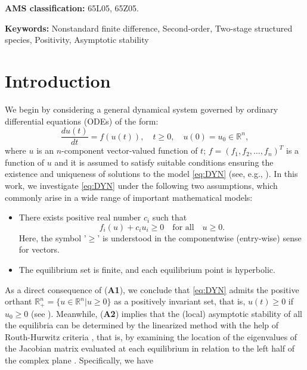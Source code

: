 \documentclass[12pt]{article}
\theoremstyle{definition}
\theoremstyle{remark}
\numberwithin{equation}{section}
\begin{document}
\begin{minipage}{0.9\linewidth}
 \footnotesize
\textbf{AMS classification:} 65L05, 65Z05.


\medskip

\noindent
\textbf{Keywords:} 
Nonstandard finite difference, Second-order, Two-stage structured species, Positivity, Asymptotic stability

\end{minipage}

\section{Introduction}\label{intro}
We begin by considering a general dynamical system governed by ordinary differential equations (ODEs) of the form:
\begin{equation}\label{eq:DYN}
\dfrac{du(t)}{dt} = f(u(t)), \quad t \geq 0, \quad u(0) = u_0 \in \mathbb{R}^n,
\end{equation}
where $u$ is an $n$-component vector-valued function of $t$; $f = (f_1, f_2, \ldots,f_n)^T$ is a function of $u$ and it is assumed to satisfy suitable conditions ensuring the existence and uniqueness of solutions to the model \eqref{eq:DYN} (see, e.g., \cite{Allen, Khalil, Smith, Stuart}). In this work, we investigate \eqref{eq:DYN} under the following two assumptions, which commonly arise in a wide range of important mathematical models:
\begin{itemize}
\item[(\textbf{A1}):] There exists positive real number $c_i$ such that
\begin{equation}\label{eq:2new}
f_i(u) + c_iu_i \geq 0 \quad \mbox{for all} \quad u \geq 0.
\end{equation}
Here, the symbol '$\geq$' is understood in the componentwise (entry-wise) sense for vectors.
\item[(\textbf{A2}):] The equilibrium set is finite, and each equilibrium point is hyperbolic.
\end{itemize}
As a direct consequence of (\textbf{A1}), we conclude that \eqref{eq:DYN} admits the positive orthant $\mathbb{R}^n_+ = \big\{u \in \mathbb{R}^n| u \geq 0\big\}$ as a positively invariant set, that is, $u(t) \geq 0$ if $u_0 \geq 0$ (see \cite{Horvath, Smith}). Meanwhile,  (\textbf{A2}) implies that the (local) asymptotic stability of all the equilibria can be determined by the linearized method with the help of Routh-Hurwitz criteria \cite{Allen, Gantmacher}, that is, by examining the location of the eigenvalues of the Jacobian matrix evaluated at each equilibrium in relation to the left half of the complex plane \cite{Allen, Khalil, Stuart}. Specifically, we have
\end{document}
